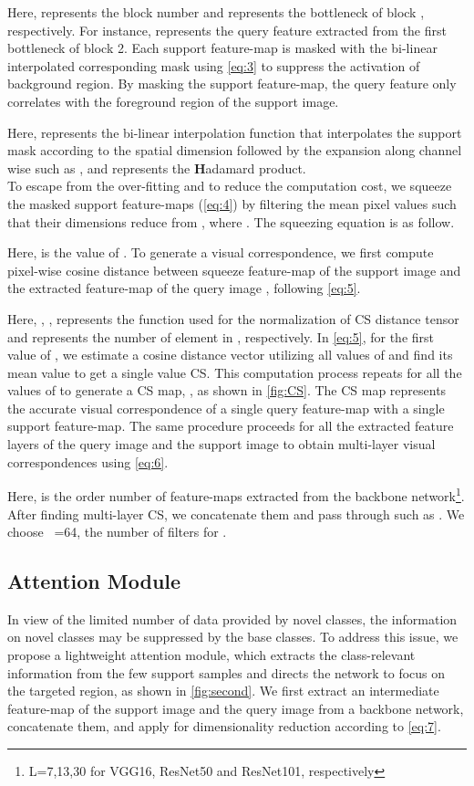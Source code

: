 \documentclass[10pt,twocolumn,letterpaper]{article}
\begin{document}
Here,  represents the block number and  represents the bottleneck of  block , respectively. For instance,  represents the query feature extracted from the first bottleneck of block 2. Each support feature-map  is masked with the bi-linear interpolated corresponding mask     using \cref{eq:3} to suppress the activation of background region. By masking the support feature-map, the query feature only correlates with the foreground region of the support image.
 
Here,  represents the bi-linear interpolation function that interpolates the support mask    according to the spatial dimension  followed by the expansion along channel wise such as   , and  represents the \textbf{H}adamard product. \\To escape from the over-fitting and to reduce the computation cost, we squeeze the masked support feature-maps  (\cref{eq:4}) by filtering the mean pixel values such that their dimensions reduce from  , where . The squeezing equation is as follow.

 
Here,  is the  value of . To generate a visual correspondence, we first compute pixel-wise cosine distance between squeeze feature-map of the support image  and the extracted feature-map of the query image , following \cref{eq:5}.


Here, , ,  represents the  function used for the normalization of CS distance tensor and  represents the number of element in , respectively. In \cref{eq:5}, for the first value of , we estimate a cosine distance vector utilizing all values of  and find its mean value to get a single value CS. This computation process repeats for all the values of  to generate a CS map, , as shown in \cref{fig:CS}. The CS map represents the accurate visual correspondence of a single query feature-map with a single support feature-map. The same procedure proceeds for all the extracted feature layers of the query image and the support image to obtain multi-layer visual correspondences using \cref{eq:6}.

Here,  is the order number of feature-maps extracted from the backbone network\footnote{L=7,13,30 for VGG16, ResNet50 and ResNet101, respectively}. After finding multi-layer CS, we concatenate them and pass through   such as . We choose \ =64, the number of filters for  . 

\subsection{Attention Module}
In view of the limited number of data provided by novel classes, the information on novel classes may be suppressed by the base classes. To address this issue, we propose a lightweight attention module, which extracts the class-relevant information from the few support samples and directs the network to focus on the targeted region, as shown in \cref{fig:second}. We first extract an intermediate feature-map of the support image and the query image from a backbone network, concatenate them, and apply   for dimensionality reduction according to \cref{eq:7}.
\end{document}
